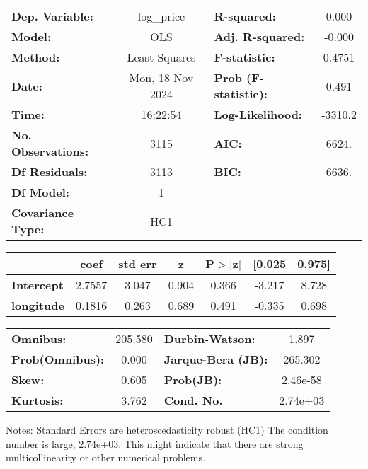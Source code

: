 \begin{center}
\begin{tabular}{lclc}
\toprule
\textbf{Dep. Variable:}    &    log\_price    & \textbf{  R-squared:         } &     0.000   \\
\textbf{Model:}            &       OLS        & \textbf{  Adj. R-squared:    } &    -0.000   \\
\textbf{Method:}           &  Least Squares   & \textbf{  F-statistic:       } &    0.4751   \\
\textbf{Date:}             & Mon, 18 Nov 2024 & \textbf{  Prob (F-statistic):} &    0.491    \\
\textbf{Time:}             &     16:22:54     & \textbf{  Log-Likelihood:    } &   -3310.2   \\
\textbf{No. Observations:} &        3115      & \textbf{  AIC:               } &     6624.   \\
\textbf{Df Residuals:}     &        3113      & \textbf{  BIC:               } &     6636.   \\
\textbf{Df Model:}         &           1      & \textbf{                     } &             \\
\textbf{Covariance Type:}  &       HC1        & \textbf{                     } &             \\
\bottomrule
\end{tabular}
\begin{tabular}{lcccccc}
                   & \textbf{coef} & \textbf{std err} & \textbf{z} & \textbf{P$> |$z$|$} & \textbf{[0.025} & \textbf{0.975]}  \\
\midrule
\textbf{Intercept} &       2.7557  &        3.047     &     0.904  &         0.366        &       -3.217    &        8.728     \\
\textbf{longitude} &       0.1816  &        0.263     &     0.689  &         0.491        &       -0.335    &        0.698     \\
\bottomrule
\end{tabular}
\begin{tabular}{lclc}
\textbf{Omnibus:}       & 205.580 & \textbf{  Durbin-Watson:     } &    1.897  \\
\textbf{Prob(Omnibus):} &   0.000 & \textbf{  Jarque-Bera (JB):  } &  265.302  \\
\textbf{Skew:}          &   0.605 & \textbf{  Prob(JB):          } & 2.46e-58  \\
\textbf{Kurtosis:}      &   3.762 & \textbf{  Cond. No.          } & 2.74e+03  \\
\bottomrule
\end{tabular}
\end{center}

Notes: \newline
 [1] Standard Errors are heteroscedasticity robust (HC1) \newline
 [2] The condition number is large, 2.74e+03. This might indicate that there are \newline
 strong multicollinearity or other numerical problems.